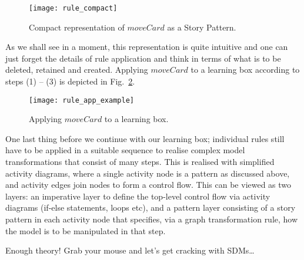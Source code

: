 \begin{figure}[htp]
\begin{center}
  \texttt{[image: rule\_compact]}
  \caption[]{Compact representation of $moveCard$ as a Story Pattern.}
  \label{fig:rule_compact}
\end{center}
\end{figure}

As we shall see in a moment, this  representation is quite intuitive and one can just forget the details of rule application and think in terms of what is to be
deleted, retained and created. Applying $moveCard$ to a learning box according to steps (1) -- (3) is depicted in Fig.~\ref{fig:rule_app_example}.

\begin{figure}[htp] 
\begin{center}
  \texttt{[image: rule\_app\_example]}
  \caption[]{Applying $moveCard$ to a learning box.}
  \label{fig:rule_app_example}
\end{center}
\end{figure}

One last thing before we continue with our learning box; individual rules still have to be applied in a suitable sequence to realise complex model
transformations that consist of many steps.  This is realised with simplified activity diagrams, where a single activity node is a pattern as discussed above,
and activity edges join nodes to form a control flow.   This can be viewed as two layers:  an imperative layer to define the top-level control flow via activity
diagrams (if-else statements, loops etc), and a pattern layer consisting of a story pattern in each activity node that specifies, via a graph transformation
rule, how the model is to be manipulated in that step.

Enough theory! Grab your mouse and let's get cracking with SDMs\ldots